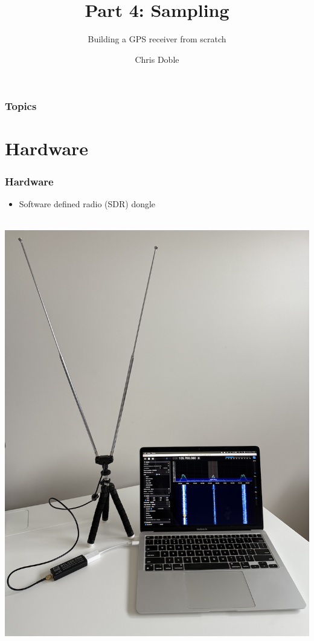 \documentclass[aspectratio=169]{beamer}
\author{Chris Doble}
\date{}
\subtitle{Building a GPS receiver from scratch}
\title{Part 4: Sampling}
\begin{document}
\frame{\titlepage}

\begin{frame}
    \frametitle{Topics}

    \tableofcontents
\end{frame}

\section{Hardware}

\begin{frame}
    \frametitle{Hardware}

    \begin{itemize}
        \item Software defined radio (SDR) dongle
    \end{itemize}

    \leavevmode \\

    \centering
    \includegraphics[width=\textwidth * 4 / 15]{1 hardware.jpg}
\end{frame}
\end{document}
